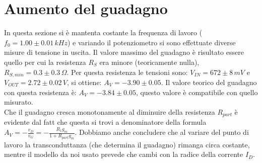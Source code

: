 \documentclass[10pt,a4paper]{article}
\begin{document}
\section{Aumento del guadagno}
In questa sezione si è mantenta costante la frequenza di lavoro ($f_0 = 1.00\pm0.01\, kHz$) e variando il potenziometro si sono effettuate diverse misure di tensione in uscita. Il valore massimo del guadagno è risultato essere quello per cui la resistenza $R_S$ era minore (teoricamente nulla), $R_{S, min} = 0.3 \pm 0.3 \, \Omega$. Per questa resistenza le tensioni  sono: $V_{IN} = 672\pm8 \, mV$ e $V_{OUT} = 2.72 \pm 0.02 \, V$, si ottiene:  $A_V = -3.90\pm0.05$. Il valore teorico del guadagno con questa resistenza è:  $A_V =-3.84\pm0.05$, questo valore è compatibile con quello misurato.\\
Che il guadagno cresca monotonamente al diminuire della resistenza $R_{part}$ è evidente dal fatt che questa si trovi a denominatore della formula $A_V = -\frac{v_D}{v_G} = - \frac{R_1 g_m}{1+R_{part} g_m}$. Dobbiamo anche concludere che al variare del punto di lavoro la transconduttanza (che determina il guadagno) rimanga circa costante, mentre il modello da noi usato prevede che cambi con la radice della corrente $I_D$.
\end{document}
